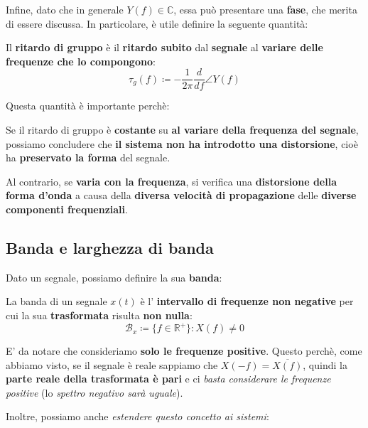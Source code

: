 Infine, dato che in generale $Y(f)\in \mathbb{C}$, essa può presentare una 
\textbf{fase}, che merita di essere discussa.
In particolare, è utile definire la seguente quantità:

\begin{definition}
    Il \textbf{ritardo di gruppo} è il \textbf{ritardo subito} dal 
    \textbf{segnale} al \textbf{variare delle frequenze che lo compongono}:
    \[
        \tau_g(f) \coloneqq -\frac{1}{2\pi} \frac{d}{df} \angle Y(f)
    \] 
\end{definition}

Questa quantità è importante perchè:

\begin{remark}
    Se il ritardo di gruppo è \textbf{costante} su 
    \textbf{al variare della frequenza del segnale}, possiamo concludere
    che \textbf{il sistema non ha introdotto una distorsione}, cioè ha 
    \textbf{preservato la forma} del segnale.

    Al contrario, se \textbf{varia con la frequenza}, si verifica una 
    \textbf{distorsione della forma d'onda} a causa della 
    \textbf{diversa velocità di propagazione} 
    delle \textbf{diverse componenti frequenziali}.
\end{remark}

\subsection{Banda e larghezza di banda}

Dato un segnale, possiamo definire la sua \textbf{banda}:

\begin{definition}
    La banda di un segnale $x(t)$ è l'
    \textbf{intervallo di frequenze non negative} 
    per cui la sua \textbf{trasformata} risulta \textbf{non nulla}:
    \[
        \mathcal{B}_x \coloneqq \{f\in \mathbb{R}^+\}   : X(f) \ne 0 
    \] 
\end{definition}

E' da notare che consideriamo \textbf{solo le frequenze positive}. Questo perchè,
come abbiamo visto, se il segnale è reale sappiamo che $X(-f) = \overline{X(f)}$,
quindi la \textbf{parte reale della trasformata è pari} e ci \textit{basta considerare
le frequenze positive} (lo \textit{spettro negativo sarà uguale}).

Inoltre, possiamo anche \textit{estendere questo concetto ai sistemi}:

